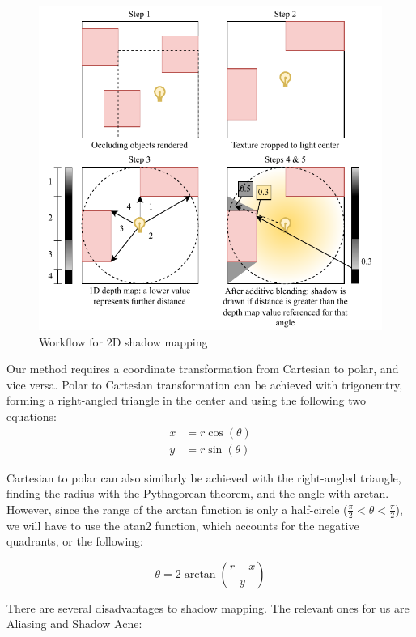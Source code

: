 \documentclass[../main/main.tex]{subfiles}
\begin{document}
\begin{figure}[H]
    \centering
    \includegraphics[width=\columnwidth]{../design/assets/shadow_mapping.pdf}
    \caption{Workflow for 2D shadow mapping}
    \label{fig:shadow-mapping}
\end{figure}

Our method requires a coordinate transformation from Cartesian to polar, and vice versa. Polar to Cartesian transformation can be achieved with trigonemtry, forming a right-angled triangle in the center and using the following two equations:
\begin{align*}
x &= r\cos(\theta)\\
y &= r\sin(\theta)
\end{align*}

Cartesian to polar can also similarly be achieved with the right-angled triangle, finding the radius with the Pythagorean theorem, and the angle with arctan. However, since the range of the arctan function is only a half-circle ($\frac{\pi}{2} < \theta < \frac{\pi}{2}$), we will have to use the atan2 function, which accounts for the negative quadrants, or the following:

\begin{equation*}
\theta = 2\arctan\left(\frac{r - x}{y}\right)
\end{equation*}

There are several disadvantages to shadow mapping. The relevant ones for us are Aliasing and Shadow Acne:
\end{document}

